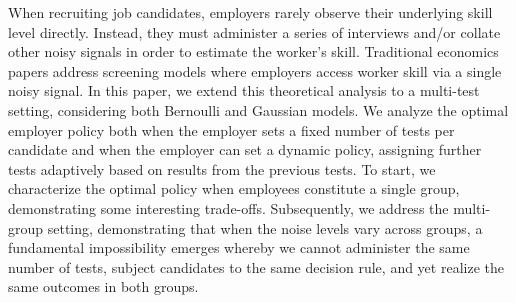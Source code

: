 When recruiting job candidates, 
employers rarely observe their underlying skill level directly.
Instead, they must administer a series of interviews
and/or collate other noisy signals
in order to estimate the worker's skill.
Traditional economics papers address screening models
where employers access worker skill via a single noisy signal.
In this paper, we extend this theoretical analysis
to a multi-test setting, considering both Bernoulli and Gaussian models. 
We analyze the optimal employer policy 
both when the employer sets a fixed number of tests per candidate
and when the employer can set a dynamic policy, 
assigning further tests adaptively
based on results from the previous tests.
To start, we characterize the optimal policy 
when employees constitute a single group, 
demonstrating some interesting trade-offs.
Subsequently, we address the multi-group setting, 
demonstrating that when the noise levels vary across groups, 
a fundamental impossibility emerges 
whereby we cannot administer the same number of tests,
subject candidates to the same decision rule,
and yet realize the same outcomes in both groups.